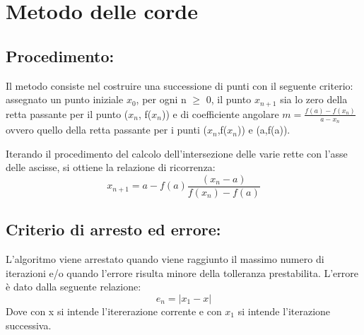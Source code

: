 \documentclass[a4paper,12pt,]{article}
\begin{document}
\section{Metodo delle corde}
\subsection{Procedimento:}
Il metodo consiste nel costruire una successione di punti con il seguente criterio:	
assegnato un punto iniziale $x_0$, per ogni n $\ge$ 0, il punto $x_{n+1}$ sia lo zero della retta passante per il punto ($x_n$, f($x_n$)) e di coefficiente angolare $m = \frac {f(a)- f(x_n)}{a-x_n}$
ovvero quello della retta passante per i punti ($x_n$,f($x_n$)) e (a,f(a)).

Iterando il procedimento del calcolo dell'intersezione delle varie rette con l'asse delle ascisse, si ottiene la relazione di ricorrenza:
\begin{equation}	x_{n+1} =  a - f(a)\frac{(x_n - a)} {f(x_n) - f(a)} \end{equation}

\subsection{Criterio di arresto ed errore:}
L'algoritmo viene arrestato quando viene raggiunto il massimo numero di iterazioni e/o quando l'errore risulta minore della tolleranza prestabilita.
L'errore è dato dalla seguente relazione:
\begin{equation} e_n=|x_1-x| \end{equation}
Dove con x  si intende l'itererazione corrente e con  $x_1$  si intende l'iterazione successiva.
\end{document}
